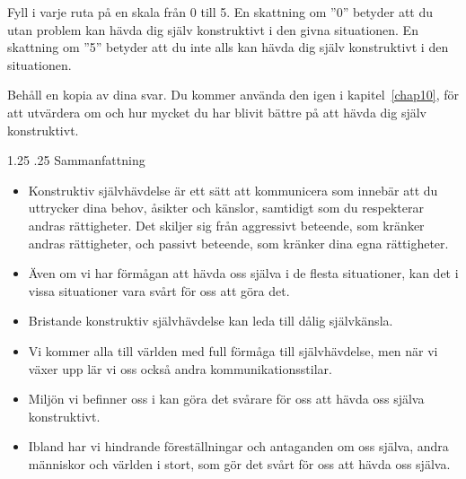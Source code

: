 \documentclass[swedish,a4paper]{book}
\makeatletter
\renewcommand\section{\@startsection{section}{1}{\z@}%
                                   {1.25\baselineskip}%
                                   {.25\baselineskip}%
                                   {\fontsize{1.25\baselineskip}{1.25\baselineskip}\selectfont\sffamily\bfseries}} %
\makeatother
\begin{document}
Fyll i varje ruta på en skala från 0 till 5. En skattning om ''0''
betyder att du utan problem kan hävda dig själv konstruktivt i den givna situationen.
En skattning om ''5'' betyder att du inte alls kan hävda dig själv konstruktivt i
den situationen.

Behåll en kopia av dina svar. Du kommer använda den
igen i kapitel~\ref{chap10}, \textit{} för att utvärdera om och hur mycket du
har blivit bättre på att hävda dig själv konstruktivt.

\section{Sammanfattning}\label{sammanfattning}

\begin{itemize}
\item
  Konstruktiv självhävdelse är ett sätt att kommunicera som innebär att
  du uttrycker dina behov, åsikter och känslor, samtidigt som du
  respekterar andras rättigheter. Det skiljer sig från aggressivt
  beteende, som kränker andras rättigheter, och passivt beteende, som
  kränker dina egna rättigheter.
\item
  Även om vi har förmågan att hävda oss själva i de flesta situationer,
  kan det i vissa situationer vara svårt för oss att göra det.
\item
  Bristande konstruktiv självhävdelse kan leda till dålig självkänsla.
\item
  Vi kommer alla till världen med full förmåga till självhävdelse, men
  när vi växer upp lär vi oss också andra kommunikationsstilar.
\item
  Miljön vi befinner oss i kan göra det svårare för oss att hävda oss
  själva konstruktivt.
\item
  Ibland har vi hindrande föreställningar och antaganden om oss själva,
  andra människor och världen i stort, som gör det svårt för oss att hävda oss
  själva.
\end{itemize}


\newlength\xwidth
\newlength\xheight
\end{document}
